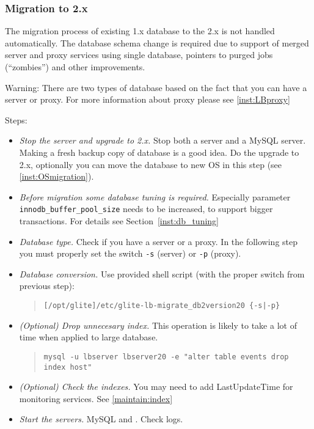 \subsubsection{Migration to \LB 2.x}
\label{inst:migrate20}
The migration process of existing \LB 1.x database to the \LB 2.x is
not handled automatically. The database schema change is required due
to support of merged \LB server and proxy services using single
database, pointers to purged jobs (``zombies'') and other
improvements.

Warning: There are two types of \LB database based on the fact that
you can have a \LB server or \LB proxy. For more information about \LB
proxy please see \ref{inst:LBproxy}

Steps:
\begin{itemize}
 \item \emph{Stop the server and upgrade to \LB 2.x.} Stop both a \LB
 server and a MySQL server. Making a fresh backup copy of database is
 a good idea. Do the upgrade to \LB 2.x, optionally you can move the
 database to new OS in this step (see \ref{inst:OSmigration}).
 \item \emph{Before migration some database tuning is
 required.} Especially parameter \texttt{innodb\_buffer\_pool\_size}
 needs to be increased, to support bigger transactions. For details
 see Section~\ref{inst:db_tuning}
 \item \emph{Database type.} Check if you have a \LB server or a \LB
 proxy. In the following step you must properly set the switch
 \verb'-s' (server) or \verb'-p' (proxy).
 \item \emph{Database conversion.} Use provided shell script (with the proper
  switch from previous step):
  \begin{quote}
  \verb'[/opt/glite]/etc/glite-lb-migrate_db2version20 {-s|-p}'
  \end{quote}
 \item \emph{(Optional) Drop unnecesary index.} This operation is
  likely to take a lot of time when applied to large database.
  \begin{quote}
  \verb'mysql -u lbserver lbserver20 -e "alter table events drop index host"'
  \end{quote}
 \item \emph{(Optional) Check the \LB indexes.} You may need to add
 LastUpdateTime for monitoring services. See \ref{maintain:index}
 \item \emph{Start the servers.} MySQL and \LB. Check logs.
\end{itemize}

